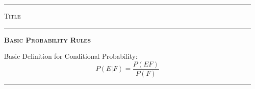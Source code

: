 \documentclass[landscape]{article}
\title{}
\author{}
\newcommand{\myline}{\vspace{4pt}\hrule  \vspace{4pt}}
\newcommand{\topic}[2]{
\noindent \textbf{\textsc{#1}}

\noindent #2

\myline
}
\begin{document}
\scriptsize

\begin{multicols*}{3}

\myline
\vspace{-0.15cm}
\begin{center}
\LARGE \textsc{Title} 
\end{center}
\myline 

\topic{Basic Probability Rules}{
Basic Definition for Conditional Probability:
\begin{equation}
P(E|F) = \frac{P(EF)}{P(F)}
\end{equation}
}


\end{multicols*}
\end{document}
